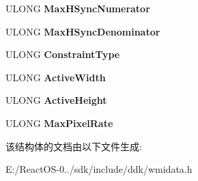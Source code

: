 \begin{DoxyCompactItemize}
U\+L\+O\+NG {\bfseries Max\+H\+Sync\+Numerator}
\item 
\mbox{\label{struct___frequency_range_descriptor_a0f4d34a5c0dfe1c89f860864eb3d2ec0}} 
U\+L\+O\+NG {\bfseries Max\+H\+Sync\+Denominator}
\item 
\mbox{\label{struct___frequency_range_descriptor_aff4683fd44490415c8ebaff1ef501578}} 
U\+L\+O\+NG {\bfseries Constraint\+Type}
\item 
\mbox{\label{struct___frequency_range_descriptor_a032207a64f4d1e6cbc5a97d71a8bd2f5}} 
U\+L\+O\+NG {\bfseries Active\+Width}
\item 
\mbox{\label{struct___frequency_range_descriptor_a38a6f57c45f4202d651be323983201cb}} 
U\+L\+O\+NG {\bfseries Active\+Height}
\item 
\mbox{\label{struct___frequency_range_descriptor_abbe95aed4325156e4b097a5718066a85}} 
U\+L\+O\+NG {\bfseries Max\+Pixel\+Rate}
\end{DoxyCompactItemize}


该结构体的文档由以下文件生成\+:\begin{DoxyCompactItemize}
\item 
E\+:/\+React\+O\+S-\/0../sdk/include/ddk/wmidata.\+h\end{DoxyCompactItemize}
